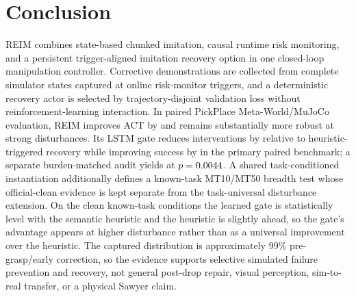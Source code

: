 \documentclass[conference]{IEEEtran}
\begin{document}
\section{Conclusion}
\label{sec:conclusion}

REIM combines state-based chunked imitation, causal runtime risk monitoring,
and a persistent trigger-aligned imitation recovery option in one closed-loop
manipulation controller. Corrective demonstrations are collected from complete
simulator states captured at online risk-monitor triggers, and a deterministic
recovery actor is selected by trajectory-disjoint validation loss without
reinforcement-learning interaction. In paired PickPlace Meta-World/MuJoCo
evaluation, REIM improves ACT by \FinalREIMGain{} and remains
substantially more robust at strong disturbances. Its LSTM gate reduces
interventions by \FinalREIMInterventionReductionVsRL{} relative to
heuristic-triggered recovery while improving success by
\FinalREIMDeltaVsRL{} in the primary paired benchmark; a separate
burden-matched audit yields \GateTauSeventeenFiveGainVsHeuristic{} at
$p=0.0044$.
A shared task-conditioned instantiation additionally defines a known-task
MT10/MT50 breadth test whose official-clean evidence is kept separate from the
task-universal disturbance extension.
On the clean known-task conditions the learned gate is statistically level
with the semantic heuristic and the heuristic is slightly ahead, so the gate's
advantage appears at higher disturbance rather than as a universal improvement
over the heuristic.
The captured distribution is approximately 99\% pre-grasp/early correction,
so the evidence supports selective simulated failure prevention and recovery,
not general post-drop repair, visual perception, sim-to-real transfer, or a
physical Sawyer claim.

\FloatBarrier
\balance


\end{document}
